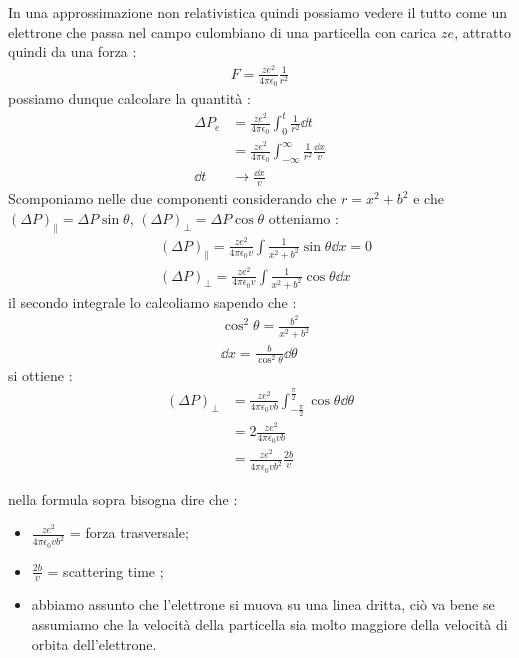 In una approssimazione non relativistica quindi possiamo vedere il tutto come un elettrone che passa nel campo culombiano di una particella con
carica $\textit{z}e$, attratto quindi da una forza : 
\begin{align*}
    F = \frac{\textit{z}e^2}{4\pi\epsilon_{0}}\frac{1}{r^2}
\end{align*}
possiamo dunque calcolare la quantità : 
\begin{align*}
        \Delta P_{e} &= \frac{\textit{z}e^2}{4\pi\epsilon_{0}}\int^{t}_{0}\frac{1}{r^2}\dd{t} \\
                     &= \frac{\textit{z}e^2}{4\pi\epsilon_{0}}\int^{\infty}_{-\infty}\frac{1}{r^2}\frac{\dd{x}}{v} \\
        \dd{t} &\rightarrow \frac{\dd{x}}{v} \tag*{Poichè v costante}
\end{align*}
Scomponiamo nelle due componenti considerando che $r = x^2 + b^2$ e che $(\Delta P)_{\parallel} = \Delta P\sin{\theta}$, $(\Delta P)_{\perp} = \Delta P\cos{\theta}$
otteniamo : 
\begin{align*}
        &(\Delta P)_{\parallel} =  \frac{\textit{z}e^2}{4\pi\epsilon_{0}v}\int\frac{1}{x^2 + b^2}\sin{\theta}\dd{x} = 0 \\
        &(\Delta P)_{\perp} =  \frac{\textit{z}e^2}{4\pi\epsilon_{0}v}\int\frac{1}{x^2 + b^2}\cos{\theta}\dd{x}
\end{align*}
\newpage
il secondo integrale lo calcoliamo sapendo che : 
\begin{align*}
        &\cos^2{\theta} = \frac{b^2}{x^2 + b^2} \\
        &\dd{x} = \frac{b}{\cos^2{\theta}}\dd{\theta}
\end{align*}
si ottiene : 
\begin{align*}
        (\Delta P)_{\perp} &=  \frac{\textit{z}e^2}{4\pi\epsilon_{0}vb}\int^{\frac{\pi}{2}}_{-\frac{\pi}{2}}\cos{\theta}\dd{\theta} \\
                           &= 2\frac{\textit{z}e^2}{4\pi\epsilon_{0}vb} \\
                           &= \frac{\textit{z}e^2}{4\pi\epsilon_{0}vb^2}\frac{2b}{v}
\end{align*}
\begin{tcolorbox}[colback=red!5!white,colframe=red!50!black,title=ATTENZIONE !]
nella formula sopra bisogna dire che : 
\begin{itemize}
        \item $ \frac{\textit{z}e^2}{4\pi\epsilon_{0}vb^2}$ = forza trasversale; 
        \item $\frac{2b}{v}$ = scattering time ; 
        \item abbiamo assunto che l'elettrone si muova su una linea dritta, ciò va bene se assumiamo che la velocità della particella sia molto maggiore 
                della velocità di orbita dell'elettrone.
\end{itemize}
\end{tcolorbox}
